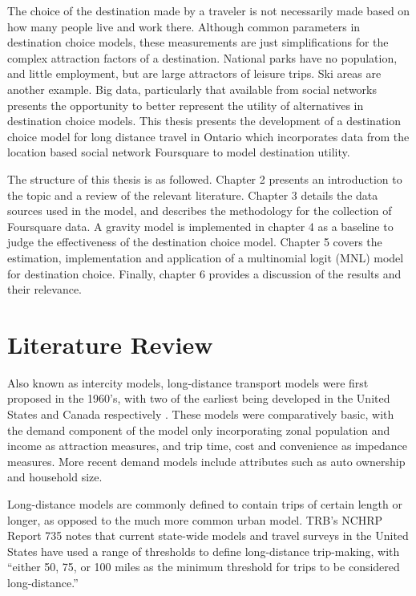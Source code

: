 The choice of the destination made by a traveler is not necessarily made based on how many people live and work there. Although common parameters in destination choice models, these measurements are just simplifications for the complex attraction factors of a destination. National parks have no population, and little employment, but are large attractors of leisure trips. Ski areas are another example. Big data, particularly that available from social networks presents the opportunity to better represent the utility of alternatives in destination choice models. This thesis presents the development of a destination choice model for long distance travel in Ontario which incorporates  data from the location based social network Foursquare to model destination utility.

The structure of this thesis is as followed. Chapter 2 presents an introduction to the topic and a review of the relevant literature. Chapter 3 details the data sources used in the model, and describes the methodology for the collection of Foursquare data. A gravity model is implemented in chapter 4 as a baseline to judge the effectiveness of  the destination choice model. Chapter 5 covers the estimation, implementation and application of a multinomial logit (MNL) model for destination choice. Finally, chapter 6 provides a discussion of the results and their relevance.


\chapter{Literature Review}
\label{section:lit-review}

Also known as intercity models, long-distance transport models were first proposed in the 1960’s, with two of the earliest being developed in the United States and Canada respectively \parencite{CTC71}. These models were comparatively basic, with the demand component of the model only incorporating zonal population and income as attraction measures, and trip time, cost and convenience as impedance measures. More recent demand models include attributes such as auto ownership and household size. 

Long-distance models are commonly defined to contain trips of certain length or longer, as opposed to the much more common urban model. TRB's NCHRP Report 735 notes that current state-wide models and travel surveys in the United States have used a range of thresholds to define long-distance trip-making, with \enquote{either 50, 75, or 100 miles as the minimum threshold for trips to be considered long-distance.}\autocite{schif12}

